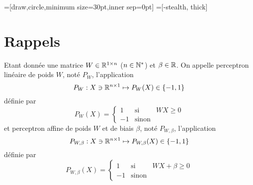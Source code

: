 \documentclass{my_class}%
\begin{document}
=[draw,circle,minimum size=30pt,inner sep=0pt]
=[-stealth, thick]
\section*{Rappels}
Etant donnée une matrice $W\in \mathbb{R} ^{1\times n}$ ($n\in \mathbb{N}^*$) et $\beta\in  \mathbb{R} $. On appelle perceptron linéaire de poids $W$, noté  $P_W$, l'application $$P_W :   X \ni \mathbb{R} ^{n\times 1}\mapsto  P_W(X)\in\{-1,1\}$$ définie par 
\begin{equation}\label{pw}
P_W(X)= \left\{\begin{matrix} 1 & \mathrm{si} & WX\geq 0 \\ -1 & \mathrm{sinon} & {} \end{matrix}\right. 
\end{equation}
et perceptron affine de poids $W$ et de biais $\beta$, noté $P_{W,\beta}$, l'application $$P_{W,\beta} :   X \ni \mathbb{R} ^{n\times 1}\mapsto  P_{W,\beta}(X)\in\{-1,1\}$$ définie par 
\begin{equation}\label{pw}
P_{W,\beta}(X)= \left\{\begin{matrix} 1 & \mathrm{si} & WX+\beta\geq 0 \\ -1 & \mathrm{sinon} & {} \end{matrix}\right. 
\end{equation}

\end{document}
